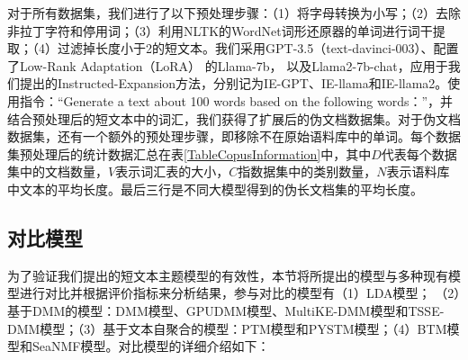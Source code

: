 对于所有数据集，我们进行了以下预处理步骤：（1）将字母转换为小写；（2）去除非拉丁字符和停用词；（3）利用NLTK的WordNet词形还原器的单词进行词干提取；（4）过滤掉长度小于2的短文本。我们采用GPT-3.5（text-davinci-003）\cite{GPT3}、配置了Low-Rank Adaptation（LoRA）\cite{lora} 的Llama-7b\cite{llama}， 以及Llama2-7b-chat\cite{llama2}，应用于我们提出的Instructed-Expansion方法，分别记为IE-GPT、IE-llama和IE-llama2。使用指令：“Generate a text about 100 words based on the following words：”，并结合预处理后的短文本中的词汇，我们获得了扩展后的伪文档数据集。对于伪文档数据集，还有一个额外的预处理步骤，即移除不在原始语料库中的单词。每个数据集预处理后的统计数据汇总在表\ref{TableCopusInformation}中，其中$D$代表每个数据集中的文档数量，$V$表示词汇表的大小，$C$指数据集中的类别数量，$N$表示语料库中文本的平均长度。最后三行是不同大模型得到的伪长文档集的平均长度。

\begin{table}
    \centering
    \caption{数据集的基本信息}
    \label{TableCopusInformation}
\end{table}

\subsection{对比模型}
为了验证我们提出的短文本主题模型的有效性，本节将所提出的模型与多种现有模型进行对比并根据评价指标来分析结果，参与对比的模型有（1）LDA模型； （2）基于DMM的模型：DMM模型、GPUDMM模型、MultiKE-DMM模型和TSSE-DMM模型；（3）基于文本自聚合的模型：PTM模型和PYSTM模型；（4）BTM模型和SeaNMF模型。对比模型的详细介绍如下：

